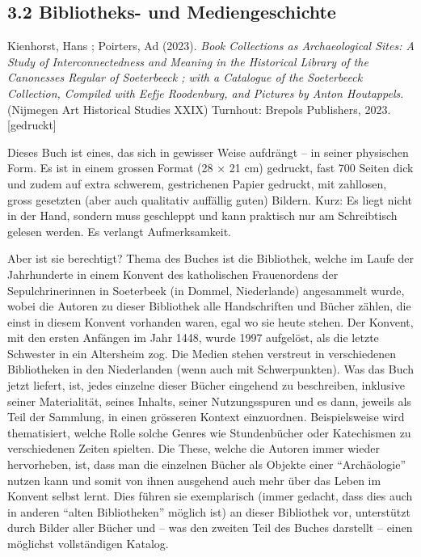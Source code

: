 \documentclass[a4paper,
fontsize=11pt,
oneside,
numbers=noperiodatend,
parskip=half-,
bibliography=totoc,
final
]{scrartcl}
\begin{document}
\hypertarget{bibliotheks--und-mediengeschichte}{%
\subsection{3.2 Bibliotheks- und
Mediengeschichte}\label{bibliotheks--und-mediengeschichte}}

Kienhorst, Hans ; Poirters, Ad (2023). \emph{Book Collections as
Archaeological Sites: A Study of Interconnectedness and Meaning in the
Historical Library of the Canonesses Regular of Soeterbeeck ; with a
Catalogue of the Soeterbeeck Collection, Compiled with Eefje Roodenburg,
and Pictures by Anton Houtappels}. (Nijmegen Art Historical Studies
XXIX) Turnhout: Brepols Publishers, 2023. {[}gedruckt{]}

Dieses Buch ist eines, das sich in gewisser Weise aufdrängt -- in seiner
physischen Form. Es ist in einem grossen Format (28 × 21 cm) gedruckt,
fast 700 Seiten dick und zudem auf extra schwerem, gestrichenen Papier
gedruckt, mit zahllosen, gross gesetzten (aber auch qualitativ auffällig
guten) Bildern. Kurz: Es liegt nicht in der Hand, sondern muss
geschleppt und kann praktisch nur am Schreibtisch gelesen werden. Es
verlangt Aufmerksamkeit.

Aber ist sie berechtigt? Thema des Buches ist die Bibliothek, welche im
Laufe der Jahrhunderte in einem Konvent des katholischen Frauenordens
der Sepulchrinerinnen in Soeterbeek (in Dommel, Niederlande) angesammelt
wurde, wobei die Autoren zu dieser Bibliothek alle Handschriften und
Bücher zählen, die einst in diesem Konvent vorhanden waren, egal wo sie
heute stehen. Der Konvent, mit den ersten Anfängen im Jahr 1448, wurde
1997 aufgelöst, als die letzte Schwester in ein Altersheim zog. Die
Medien stehen verstreut in verschiedenen Bibliotheken in den
Niederlanden (wenn auch mit Schwerpunkten). Was das Buch jetzt liefert,
ist, jedes einzelne dieser Bücher eingehend zu beschreiben, inklusive
seiner Materialität, seines Inhalts, seiner Nutzungsspuren und es dann,
jeweils als Teil der Sammlung, in einen grösseren Kontext einzuordnen.
Beispielsweise wird thematisiert, welche Rolle solche Genres wie
Stundenbücher oder Katechismen zu verschiedenen Zeiten spielten. Die
These, welche die Autoren immer wieder hervorheben, ist, dass man die
einzelnen Bücher als Objekte einer \enquote{Archäologie} nutzen kann und
somit von ihnen ausgehend auch mehr über das Leben im Konvent selbst
lernt. Dies führen sie exemplarisch (immer gedacht, dass dies auch in
anderen \enquote{alten Bibliotheken} möglich ist) an dieser Bibliothek
vor, unterstützt durch Bilder aller Bücher und -- was den zweiten Teil
des Buches darstellt -- einen möglichst vollständigen Katalog.
\end{document}
